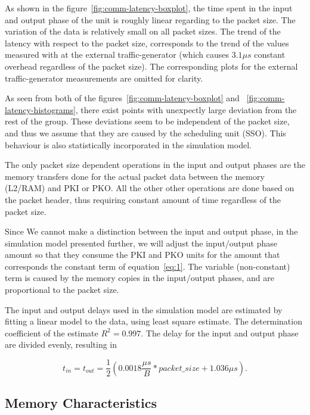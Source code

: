 As shown in the figure~\ref{fig:comm-latency-boxplot}, the time spent in the input and output phase of the unit is roughly linear regarding to the packet size. The variation of the data is relatively small on all packet sizes. The trend of the latency with respect to the packet size, corresponds to the trend of the values measured with at the external traffic-generator (which causes $3.1\mu s$ constant overhead regardless of the packet size). The corresponding plots for the external traffic-generator measurements are omitted for clarity.

As seen from both of the figures~\ref{fig:comm-latency-boxplot} and ~\ref{fig:comm-latency-histograms}, there exist points with unexpectly large deviation from the rest of the group. These deviations seem to be independent of the packet size, and thus we assume that they are caused by the scheduling unit (SSO). This behaviour is also statistically incorporated in the simulation model.

The only packet size dependent operations in the input and output phases are the memory transfers done for the actual packet data between the memory (L2/RAM) and PKI or PKO. All the other other operations are done based on the packet header, thus requiring constant amount of time regardless of the packet size.

Since We cannot make a distinction between the input and output phase, in the simulation model presented further, we will adjust the input/output phase amount so that they consume the PKI and PKO units for the amount that corresponds the constant term of equation~\ref{eq:1}. The variable (non-constant) term is caused by the memory copies in the input/output phases, and are proportional to the packet size.

The input and output delays used in the simulation model are estimated by fitting a linear model to the data, using least square estimate. The determination coefficient of the estimate $R^2 = 0.997$. The delay for the input and output phase are divided evenly, resulting in

\begin{equation}
  \label{eq:1}
  t_{in} = t_{out} = \frac{1}{2}(0.0018\frac{\mu s}{B} * packet\_size + 1.036\mu s).
\end{equation}

\subsection{Memory Characteristics}
\label{sec:memory-characteristics}

